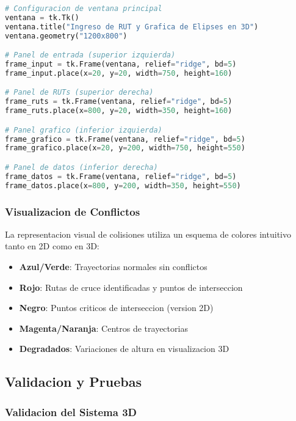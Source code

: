 \documentclass[12pt,a4paper]{article}
\begin{document}
\begin{lstlisting}[language=Python, caption=Configuracion de la interfaz 3D]
# Configuracion de ventana principal
ventana = tk.Tk()
ventana.title("Ingreso de RUT y Grafica de Elipses en 3D")
ventana.geometry("1200x800")

# Panel de entrada (superior izquierda)
frame_input = tk.Frame(ventana, relief="ridge", bd=5)
frame_input.place(x=20, y=20, width=750, height=160)

# Panel de RUTs (superior derecha)
frame_ruts = tk.Frame(ventana, relief="ridge", bd=5)
frame_ruts.place(x=800, y=20, width=350, height=160)

# Panel grafico (inferior izquierda)
frame_grafico = tk.Frame(ventana, relief="ridge", bd=5)
frame_grafico.place(x=20, y=200, width=750, height=550)

# Panel de datos (inferior derecha)
frame_datos = tk.Frame(ventana, relief="ridge", bd=5)
frame_datos.place(x=800, y=200, width=350, height=550)
\end{lstlisting}

\subsubsection{Visualizacion de Conflictos}

La representacion visual de colisiones utiliza un esquema de colores intuitivo tanto en 2D como en 3D:

\begin{itemize}
    \item \textbf{Azul/Verde}: Trayectorias normales sin conflictos
    \item \textbf{Rojo}: Rutas de cruce identificadas y puntos de interseccion
    \item \textbf{Negro}: Puntos criticos de interseccion (version 2D)
    \item \textbf{Magenta/Naranja}: Centros de trayectorias
    \item \textbf{Degradados}: Variaciones de altura en visualizacion 3D
\end{itemize}

\subsection{Validacion y Pruebas}

\subsubsection{Validacion del Sistema 3D}
\end{document}

